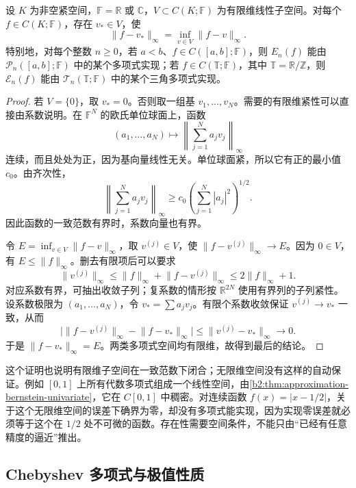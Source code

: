 \begin{theorem}
\label{b2:thm:approximation-best-existence}
设 \(K\) 为非空紧空间，\(\mathbb F=\mathbb R\) 或 \(\mathbb C\)，\(V\subset C(K;\mathbb F)\) 为有限维线性子空间。对每个 \(f\in C(K;\mathbb F)\)，存在 \(v_*\in V\)，使
\[
 \lVert f-v_*\rVert_\infty
 =\inf_{v\in V}\lVert f-v\rVert_\infty.
\]
特别地，对每个整数 \(n\geq0\)，若 \(a<b\)、\(f\in C([a,b];\mathbb F)\)，则 \(E_n(f)\) 能由 \(\mathcal P_n([a,b];\mathbb F)\) 中的某个多项式实现；若 \(f\in C(\mathbb T;\mathbb F)\)，其中 \(\mathbb T=\mathbb R/\mathbb Z\)，则 \(\mathcal E_n(f)\) 能由 \(\mathcal T_n(\mathbb T;\mathbb F)\) 中的某个三角多项式实现。
\end{theorem}
\begin{proof}
若 \(V=\{0\}\)，取 \(v_*=0\)。否则取一组基 \(v_1,\ldots,v_N\)。需要的有限维紧性可以直接由系数说明。在 \(\mathbb F^N\) 的欧氏单位球面上，函数
\[
 (a_1,\ldots,a_N)\longmapsto
 \left\lVert\sum_{j=1}^Na_jv_j\right\rVert_\infty
\]
连续，而且处处为正，因为基向量线性无关。单位球面紧，所以它有正的最小值 \(c_0\)。由齐次性，
\[
 \left\lVert\sum_{j=1}^Na_jv_j\right\rVert_\infty
 \geq c_0\left(\sum_{j=1}^N|a_j|^2\right)^{1/2}.
\]
因此函数的一致范数有界时，系数向量也有界。

令 \(E=\inf_{v\in V}\lVert f-v\rVert_\infty\)，取 \(v^{(j)}\in V\)，使 \(\lVert f-v^{(j)}\rVert_\infty\to E\)。因为 \(0\in V\)，有 \(E\leq\lVert f\rVert_\infty\)。删去有限项后可以要求
\[
 \lVert v^{(j)}\rVert_\infty
 \leq\lVert f\rVert_\infty+\lVert f-v^{(j)}\rVert_\infty
 \leq2\lVert f\rVert_\infty+1.
\]
对应系数有界，可抽出收敛子列；复系数的情形按 \(\mathbb R^{2N}\) 使用有界列的子列紧性。设系数极限为 \((a_1,\ldots,a_N)\)，令 \(v_*=\sum a_jv_j\)。有限个系数收敛保证 \(v^{(j)}\to v_*\) 一致，从而
\[
 \bigl|\lVert f-v^{(j)}\rVert_\infty-\lVert f-v_*\rVert_\infty\bigr|
 \leq\lVert v^{(j)}-v_*\rVert_\infty\longrightarrow0.
\]
于是 \(\lVert f-v_*\rVert_\infty=E\)。两类多项式空间均有限维，故得到最后的结论。
\end{proof}

这个证明也说明有限维子空间在一致范数下闭合；无限维空间没有这样的自动保证。例如 \([0,1]\) 上所有代数多项式组成一个线性空间，由\cref{b2:thm:approximation-bernstein-univariate}，它在 \(C[0,1]\) 中稠密。对连续函数 \(f(x)=|x-1/2|\)，关于这个无限维空间的误差下确界为零，却没有多项式能实现，因为实现零误差就必须等于这个在 \(1/2\) 处不可微的函数。存在性需要空间条件，不能只由“已经有任意精度的逼近”推出。

\subsection{Chebyshev 多项式与极值性质}
\label{b2:subsec:020802}

